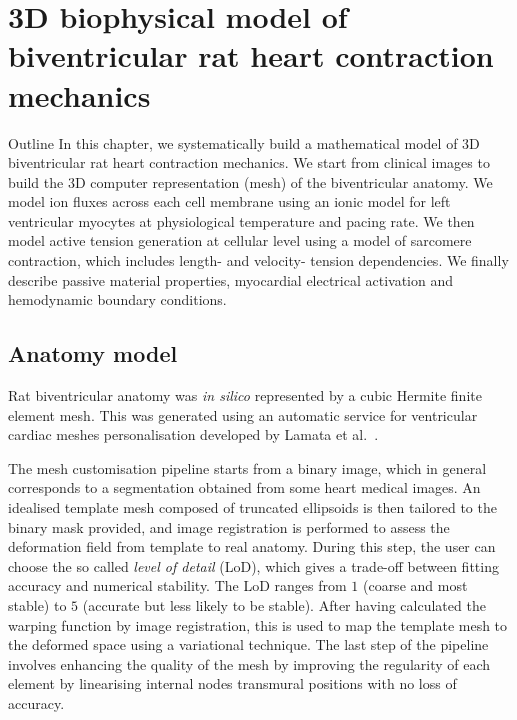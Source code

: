 \chapter{3D biophysical model of biventricular rat heart contraction 
mechanics}\label{cha:chapter02}
%
%
%
\begin{remark}{Outline}
    In this chapter, we systematically build a mathematical model of $3$D biventricular rat heart contraction mechanics. We start from clinical images to build the $3$D computer representation (mesh) of the biventricular anatomy. We model ion fluxes across each cell membrane using an ionic model for left ventricular myocytes at physiological temperature and pacing rate. We then model active tension generation at cellular level using a model of sarcomere contraction, which includes length- and velocity- tension dependencies. We finally describe passive material properties, myocardial electrical activation and hemodynamic boundary conditions.
\end{remark}


%
%
%
\section{Anatomy model}\label{sec:ch2anatomy}
Rat biventricular anatomy was \textit{in silico} represented by a cubic Hermite finite element mesh. This was generated using an automatic service for ventricular cardiac meshes personalisation developed by Lamata et al.~\cite{Lamata:2011, Lamata:2014}.

\vspace{0.2cm}
The mesh customisation pipeline starts from a binary image, which in general corresponds to a segmentation obtained from some heart medical images. An idealised template mesh composed of truncated ellipsoids is then tailored to the binary mask provided, and image registration is performed to assess the deformation field from template to real anatomy. During this step, the user can choose the so called \textit{level of detail} (\acs{LoD}), which gives a trade-off between fitting accuracy and numerical stability. The LoD ranges from $1$ (coarse and most stable) to $5$ (accurate but less likely to be stable). After having calculated the warping function by image registration, this is used to map the template mesh to the deformed space using a variational technique. The last step of the pipeline involves enhancing the quality of the mesh by improving the regularity of each element by linearising internal nodes transmural positions with no loss of accuracy.

